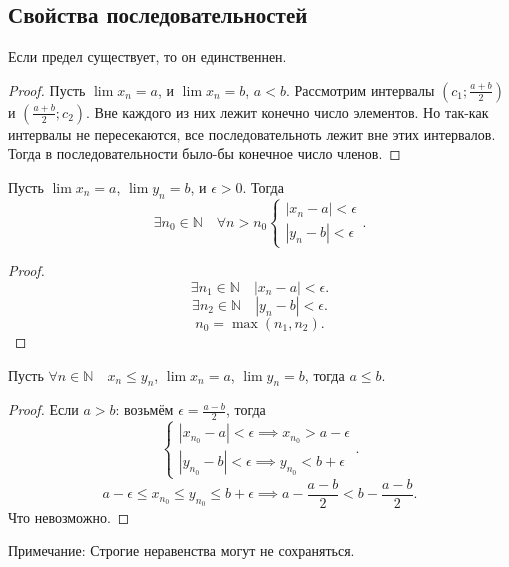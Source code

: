 \documentclass[11pt, oneside]{article}   	%
\begin{document}
        \subsection{Свойства последовательностей}
        \begin{theorem}
            Если предел существует, то он единственнен.
            \begin{proof}
                Пусть $\lim x_n =a$, и  $\lim x_n=b$,  $a<b$.
                Рассмотрим интервалы $\left( c_1; \frac{a+b}{2} \right) $ и $\left( \frac{a+b}{2}; c_2 \right) $. Вне каждого из них лежит конечно число элементов. Но так-как интервалы не пересекаются, все последовательноть лежит вне этих интервалов. Тогда в последовательности было-бы конечное число членов.
            \end{proof}
        \end{theorem}
        \begin{tlemma}
            \label{mixer}
            Пусть $\lim x_n=a$,  $\lim y_n=b$, и  $\epsilon>0$. Тогда
            \[ \exists{n_0 \in \mathbb{N}}\quad \forall{n>n_0} 
                \begin{cases}
                    |x_n-a|<\epsilon\\
                    |y_n-b|<\epsilon
                \end{cases}
            .\]     
        \begin{proof}
            \[ \exists{n_1 \in \mathbb{N}}\quad |x_n-a|<\epsilon.\]
            \[ \exists{n_2 \in \mathbb{N}}\quad |y_n-b|<\epsilon .\]
            \[ n_0 = \max\left( n_1, n_2 \right)  .\] 
        \end{proof}
        \end{tlemma}
        \begin{theorem}
            Пусть $\forall{n \in \mathbb{N}}\quad x_n\le y_n$, $\lim x_n = a$,  $\lim y_n = b$, тогда  $a \le  b$.
             \begin{proof}
                 Если $a>b$: возьмём  $\epsilon=\frac{a-b}{2}$, тогда 
                 \[ \begin{cases}
                     |x_{n_0} - a| < \epsilon \implies x_{n_0} > a-\epsilon\\
                     |y_{n_0} - b| < \epsilon \implies y_{n_0}<b+\epsilon
                 \end{cases} .\] 
                 \[ a-\epsilon \le x_{n_0} \le y_{n_0} \le b+\epsilon \implies a-\frac{a-b}{2}<b-\frac{a-b}{2} .\]
                 Что невозможно.
             \end{proof}    
             Примечание: Строгие неравенства могут не сохраняться.
        \end{theorem}
\end{document}
